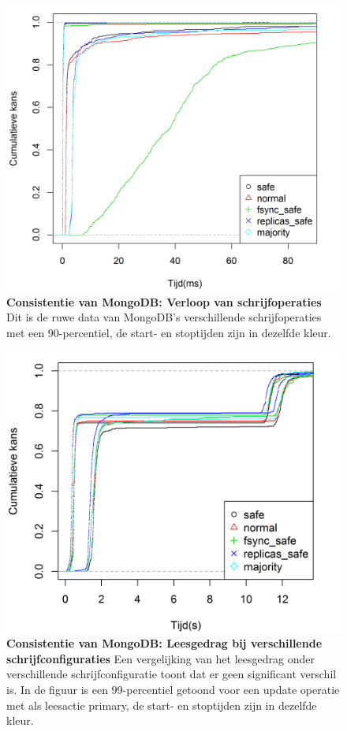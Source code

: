 \begin{figure}[htb!] 
	\centering
	\includegraphics[width=.7\textwidth]{img/Observaties/MongoDB/ECDF-Compare-Write-insert-1}
	\caption{\textbf{Consistentie van MongoDB: Verloop van schrijfoperaties} \newline
	Dit is de ruwe data van MongoDB's verschillende schrijfoperaties met een 90-percentiel, de start- en stoptijden zijn in dezelfde kleur.  }
	\label{fig:consistentie-mongodb-all-mongodb-write}
\end{figure}

\begin{figure}[ht!] 
	\centering \includegraphics[width=.70\textwidth]{img/Observaties/MongoDB/ECDF-Write-update-primarypreferred-1-2}
	\caption{\textbf{Consistentie van MongoDB: Leesgedrag bij verschillende schrijfconfiguraties } \newline
	Een vergelijking van het leesgedrag onder verschillende schrijfconfiguratie toont dat er geen significant verschil is. In de figuur is een 99-percentiel getoond voor een update operatie met als leesactie primary, de start- en stoptijden zijn in dezelfde kleur.  
	 } 
	\label{fig:consistentie-mongodb-verschillende-schrijfacties}
\end{figure}

